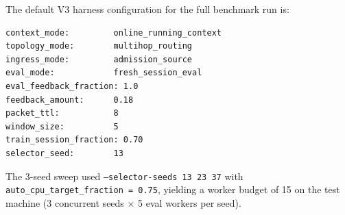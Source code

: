 \documentclass[10pt,twocolumn]{article}
\begin{document}
The default V3 harness configuration for the full benchmark run is:

\begin{verbatim}
context_mode:         online_running_context
topology_mode:        multihop_routing
ingress_mode:         admission_source
eval_mode:            fresh_session_eval
eval_feedback_fraction: 1.0
feedback_amount:      0.18
packet_ttl:           8
window_size:          5
train_session_fraction: 0.70
selector_seed:        13
\end{verbatim}

The 3-seed sweep used \texttt{--selector-seeds 13 23 37} with
\texttt{auto\_cpu\_target\_fraction = 0.75},
yielding a worker budget of 15 on the test machine
(3 concurrent seeds $\times$ 5 eval workers per seed).
\end{document}
